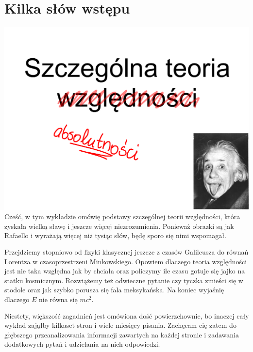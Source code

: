 \documentclass[10pt,twocolumn,fleqn,polish]{article}
\begin{document}
\setlength{\abovedisplayskip}{0.5em}
\setlength{\belowdisplayskip}{0.5em}
\setlength{\abovedisplayshortskip}{0.5em}
\setlength{\belowdisplayshortskip}{0.5em}

\section{Kilka słów wstępu}
\noindent\includegraphics[width=1\linewidth]{pages/STA-page0}
Cześć, w tym wykładzie omówię podstawy szczególnej teorii względności, która
zyskała wielką sławę i jeszcze więcej niezrozumienia.
Ponieważ obrazki są jak Rafaello i wyrażają więcej niż tysiąc słów, będę sporo
się nimi wspomagał.

Przejdziemy stopniowo od fizyki klasycznej jeszcze z czasów Galileusza do
równań Lorentza w czasoprzestrzeni Minkowskiego.
Opowiem dlaczego teoria względności jest nie taka względna jak by chciała
oraz policzymy ile czasu gotuje się jajko na statku kosmicznym.
Rozwiążemy też odwieczne pytanie czy tyczka zmieści się w stodole oraz jak
szybko porusza się fala meksykańska.
Na koniec wyjaśnię dlaczego $E$ nie równa się $mc^2$.

Niestety, większość zagadnień jest omówiona dość powierzchownie, bo inaczej
cały wykład zająłby kilkaset stron i wiele miesięcy pisania.
Zachęcam cię zatem do głębszego przeanalizowania informacji zawartych na każdej stronie
i zadawania dodatkowych pytań i udzielania na nich odpowiedzi.
\newpage
\end{document}
